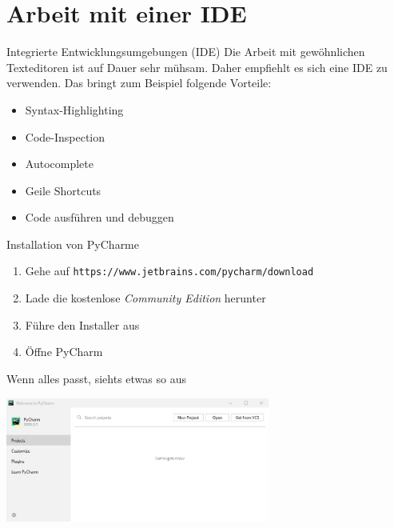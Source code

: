 \section{Arbeit mit einer IDE}

\begin{frame}
	\begin{block}{Integrierte Entwicklungsumgebungen (IDE)}
		\vspace{2pt}
	Die Arbeit mit gewöhnlichen Texteditoren ist auf Dauer sehr mühsam. Daher empfiehlt es sich eine IDE zu verwenden. 
	Das bringt zum Beispiel folgende Vorteile: 
	\begin{itemize}
		\item Syntax-Highlighting
		\item Code-Inspection
		\item Autocomplete
		\item Geile Shortcuts
		\item Code ausführen und debuggen
	\end{itemize}	
	\end{block}
\end{frame}

\begin{frame}
	\begin{block}{Installation von PyCharme}
		\vspace{2pt}
		\begin{enumerate}
			\item Gehe auf 
			\texttt{https://www.jetbrains.com/pycharm/download} \\
			\item Lade die kostenlose \textit{Community Edition} herunter
			\item Führe den Installer aus
			\item Öffne PyCharm
		\end{enumerate}
	\end{block}
	
	
	\begin{block}{Wenn alles passt, siehts etwas so aus}
		\vspace{2pt}
		\begin{center}
		\includegraphics[width=0.65\textwidth]{pycharme.jpg}
		\end{center}
	\end{block}
	
\end{frame}



